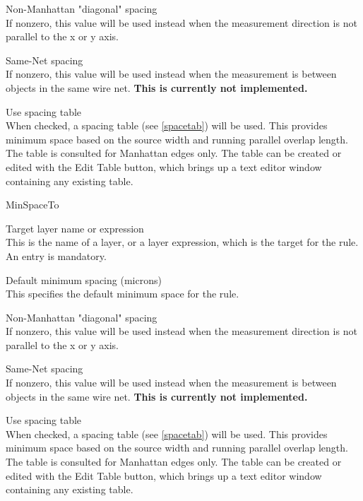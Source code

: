\begin{description}
\begin{description}
\item{\cb Non-Manhattan "diagonal" spacing}\\
If nonzero, this value will be used instead when the measurement
direction is not parallel to the x or y axis.

\item{\cb Same-Net spacing}\\
If nonzero, this value will be used instead when the measurement
is between objects in the same wire net.  {\bf This is currently not
implemented.}

\item{\cb Use spacing table}\\
When checked, a spacing table (see \ref{spacetab}) will be used.  This
provides minimum space based on the source width and running parallel
overlap length.  The table is consulted for Manhattan edges only.  The
table can be created or edited with the {\cb Edit Table} button, which
brings up a text editor window containing any existing table.
\end{description}

\item{\vt MinSpaceTo}\\
\begin{description}
\item{\cb Target layer name or expression}\\
This is the name of a layer, or a layer expression, which is the
target for the rule.  An entry is mandatory.

\item{\cb Default minimum spacing (microns)}\\
This specifies the default minimum space for the rule.

\item{\cb Non-Manhattan "diagonal" spacing}\\
If nonzero, this value will be used instead when the measurement
direction is not parallel to the x or y axis.

\item{\cb Same-Net spacing}\\
If nonzero, this value will be used instead when the measurement
is between objects in the same wire net.  {\bf This is currently not
implemented.}

\item{\cb Use spacing table}\\
When checked, a spacing table (see \ref{spacetab}) will be used.  This
provides minimum space based on the source width and running parallel
overlap length.  The table is consulted for Manhattan edges only.  The
table can be created or edited with the {\cb Edit Table} button, which
brings up a text editor window containing any existing table.
\end{description}


\end{description}
